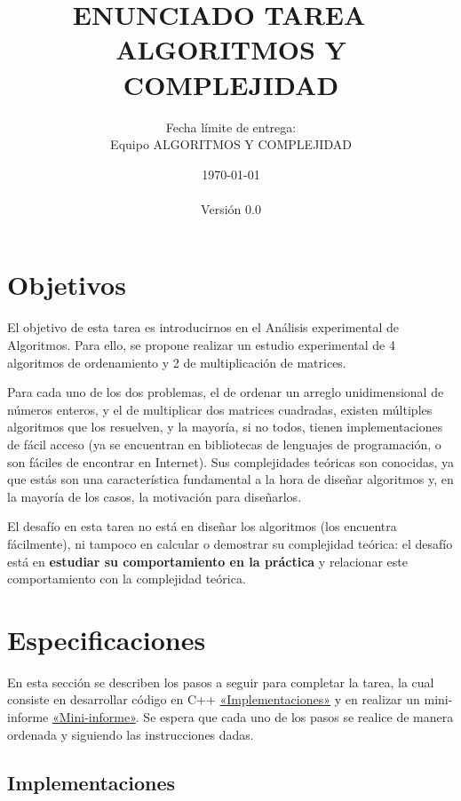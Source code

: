 \documentclass[11pt,spanish]{article}
\title{%
  \huge
  \textbf{ENUNCIADO TAREA \tnum~ \\ ALGORITMOS Y COMPLEJIDAD} \\[1ex]
  \emph{\textquote{Más allá de la notación asintótica: Análisis experimental de algoritmos de ordenamiento y multiplicación de matrices.}}
}
\author{%
  Fecha límite de entrega: \deadline \\[1ex]
  Equipo ALGORITMOS Y COMPLEJIDAD \sem
}
\date{%
  \small
  \today \\
  \currenttime \\[1ex]
  Versión 0.0
}
\begin{document}
\maketitle
\thispagestyle{fancy}
\vspace{-1.0\baselineskip}

\newpage

\tableofcontents

\newpage

\section{Objetivos}
El objetivo de esta tarea es introducirnos en el Análisis experimental de Algoritmos. Para ello, se propone realizar un estudio experimental de 4 algoritmos de ordenamiento y 2 de multiplicación de matrices.

Para cada uno de los dos problemas, el de ordenar un arreglo unidimensional de números enteros, y el de multiplicar dos matrices cuadradas, existen múltiples algoritmos que los resuelven, y la mayoría, si no todos, tienen implementaciones de fácil acceso (ya se encuentran en bibliotecas de lenguajes de programación, o son fáciles de encontrar en Internet). Sus complejidades teóricas son conocidas, ya que estás son una característica fundamental a la hora de diseñar algoritmos y, en la mayoría de los casos, la motivación para diseñarlos.

El desafío en esta tarea no está en diseñar los algoritmos (los encuentra fácilmente), ni tampoco en calcular o demostrar su complejidad teórica: el desafío está en \textbf{estudiar su comportamiento en la práctica} y relacionar este comportamiento con la complejidad teórica.

\section{Especificaciones}
En esta sección se describen los pasos a seguir para completar la tarea, la cual consiste en desarrollar código en C++ \hyperref[subsec:implementaciones]{«Implementaciones»} y en realizar un mini-informe \hyperref[subsec:mini-informe]{«Mini-informe»}. Se espera que cada uno de los pasos se realice de manera ordenada y siguiendo las instrucciones dadas.

\subsection{Implementaciones}\label{subsec:implementaciones}
\end{document}
